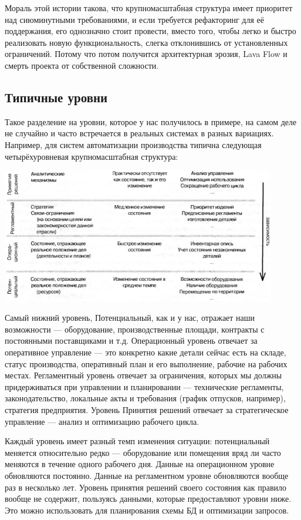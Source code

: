 \documentclass[a5paper]{article}
\begin{document}
Мораль этой истории такова, что крупномасштабная структура имеет приоритет над сиюминутными требованиями, и если требуется рефакторинг для её поддержания, его однозначно стоит провести, вместо того, чтобы легко и быстро реализовать новую функциональность, слегка отклонившись от установленных ограничений. Потому что потом получится архитектурная эрозия, Lava Flow и смерть проекта от собственной сложности.

\subsection{Типичные уровни}

Такое разделение на уровни, которое у нас получилось в примере, на самом деле не случайно и часто встречается в реальных системах в разных вариациях. Например, для систем автоматизации производства типична следующая четырёхуровневая крупномасштабная структура:

\begin{center}
    \includegraphics[width=0.9\textwidth]{factoryAutomationLayers.png}
\end{center}

Самый нижний уровень, Потенциальный, как и у нас, отражает наши возможности --- оборудование, производственные площади, контракты с постоянными поставщиками и т.д. Операционный уровень отвечает за оперативное управление --- это конкретно какие детали сейчас есть на складе, статус производства, оперативный план и его выполнение, рабочие на рабочих местах. Регламентный уровень отвечает за ограничения, которых мы должны придерживаться при управлении и планировании --- технические регламенты, законодательство, локальные акты и требования (график отпусков, например), стратегия предприятия. Уровень Принятия решений отвечает за стратегическое управление --- анализ и оптимизацию рабочего цикла.

Каждый уровень имеет разный темп изменения ситуации: потенциальный меняется относительно редко --- оборудование или помещения вряд ли часто меняются в течение одного рабочего дня. Данные на операционном уровне обновляются постоянно. Данные на регламентном уровне обновляются вообще раз в несколько лет. Уровень принятия решений своего состояния как правило вообще не содержит, пользуясь данными, которые предоставляют уровни ниже. Это можно использовать для планирования схемы БД и оптимизации запросов.
\end{document}
